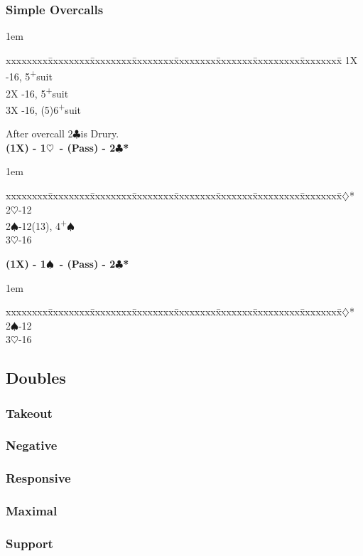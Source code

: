 \documentclass[10pt]{article}
\renewcommand{\c}{$\clubsuit$}
\renewcommand{\d}{$\diamondsuit$}
\newcommand{\h}{$\heartsuit$}
\newcommand{\s}{$\spadesuit$}
\newcommand{\p}{\textsuperscript{+}}
\newcommand{\m}{\textsuperscript{\textminus}}
\newenvironment{bidtable}[1][]
{\textbf{#1}
  \begin{adjustwidth}{1em}{}
    \addvspace{2pt}
    \begin{tabbing}
      xxxxxxxx\=xxxxxxxx\=xxxxxxxx\=xxxxxxxx\=xxxxxxxx\=xxxxxxx\=xxxxxxxxx\=xxxxxxxx\=\kill}
{\end{tabbing}\end{adjustwidth}\bigskip}%
\begin{document}
\subsubsection{Simple Overcalls}

\begin{bidtable}
1X -16, 5\p suit     \\
2X -16, 5\p suit    \\
3X -16, (5)6\p suit
\end{bidtable}

After overcall 2\c is Drury.\\

\begin{bidtable}[(1X) - 1\h\ - (Pass) - 2\c*]
2\d*       {}\m                           \\
2\h        {}-12                         \\
2\s        {}-12(13), 4\p\s               \\
3\h        {}-16
\end{bidtable}

\begin{bidtable}[(1X) - 1\s\ - (Pass) - 2\c*]
2\d* {}\m   \\
2\s  {}-12 \\
3\h  {}-16
\end{bidtable}

\subsection{Doubles}

\subsubsection{Takeout}

\subsubsection{Negative}

\subsubsection{Responsive}

\subsubsection{Maximal}

\subsubsection{Support}
\end{document}
